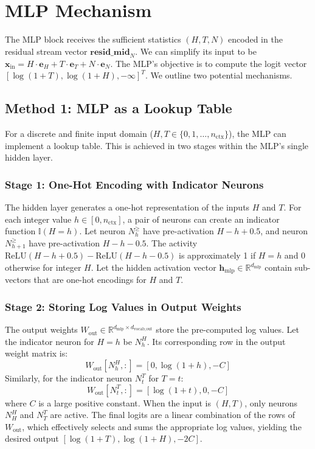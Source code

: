 \documentclass{article}
\begin{document}
\section{MLP Mechanism}

The MLP block receives the sufficient statistics $(H, T, N)$ encoded in the residual stream vector $\mathbf{resid\_mid}_N$. We can simplify its input to be $\mathbf{x}_{\text{in}} = H \cdot \mathbf{e}_H + T \cdot \mathbf{e}_T + N \cdot \mathbf{e}_N$. The MLP's objective is to compute the logit vector $[\log(1+T), \log(1+H), -\infty]^T$. We outline two potential mechanisms.

\subsection{Method 1: MLP as a Lookup Table}
For a discrete and finite input domain ($H, T \in \{0, 1, \dots, n_{\text{ctx}}\}$), the MLP can implement a lookup table. This is achieved in two stages within the MLP's single hidden layer.

\subsubsection{Stage 1: One-Hot Encoding with Indicator Neurons}
The hidden layer generates a one-hot representation of the inputs $H$ and $T$. For each integer value $h \in [0, n_{\text{ctx}}]$, a pair of neurons can create an indicator function $\mathbb{I}(H=h)$.
Let neuron $N_h^{\ge}$ have pre-activation $H - h + 0.5$, and neuron $N_{h+1}^{\ge}$ have pre-activation $H - h - 0.5$. The activity $\text{ReLU}(H - h + 0.5) - \text{ReLU}(H - h - 0.5)$ is approximately 1 if $H=h$ and 0 otherwise for integer $H$.
Let the hidden activation vector $\mathbf{h}_{\text{mlp}} \in \mathbb{R}^{d_{\text{mlp}}}$ contain sub-vectors that are one-hot encodings for $H$ and $T$.

\subsubsection{Stage 2: Storing Log Values in Output Weights}
The output weights $W_{\text{out}} \in \mathbb{R}^{d_{\text{mlp}} \times d_{\text{vocab\_out}}}$ store the pre-computed log values. Let the indicator neuron for $H=h$ be $N_h^H$. Its corresponding row in the output weight matrix is:
\begin{equation}
    W_{\text{out}}[N_h^H, :] = [0, \log(1+h), -C]
\end{equation}
Similarly, for the indicator neuron $N_t^T$ for $T=t$:
\begin{equation}
    W_{\text{out}}[N_t^T, :] = [\log(1+t), 0, -C]
\end{equation}
where $C$ is a large positive constant. When the input is $(H, T)$, only neurons $N_H^H$ and $N_T^T$ are active. The final logits are a linear combination of the rows of $W_{\text{out}}$, which effectively selects and sums the appropriate log values, yielding the desired output $[\log(1+T), \log(1+H), -2C]$.
\end{document}
